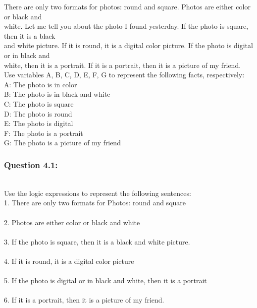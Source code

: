 There are only two formats for photos: round and square. Photos are either color or black and\\
white. Let me tell you about the photo I found yesterday. If the photo is square, then it is a black\\
and white picture. If it is round, it is a digital color picture. If the photo is digital or in black and\\
white, then it is a portrait. If it is a portrait, then it is a picture of my friend.\\
Use variables A, B, C, D, E, F, G to represent the following facts, respectively:\\
\tabto{1cm}A: The photo is in color\\
\tabto{1cm}B: The photo is in black and white\\
\tabto{1cm}C: The photo is square\\
\tabto{1cm}D: The photo is round\\
\tabto{1cm}E: The photo is digital\\
\tabto{1cm}F: The photo is a portrait\\
\tabto{1cm}G: The photo is a picture of my friend\\
\subsubsection{Question 4.1:}\\
Use the logic expressions to represent the following sentences:\\
\tabto{1cm} 1. There are only two formats for Photos: round and square\\
\tabto{2cm}\\
\tabto{1cm} 2. Photos are either color or black and white\\
\tabto{2cm}\\
\tabto{1cm} 3. If the photo is square, then it is a black and white picture.\\
\tabto{2cm}\\
\tabto{1cm} 4. If it is round, it is a digital color picture\\
\tabto{2cm}\\
\tabto{1cm} 5. If the photo is digital or in black and white, then it is a portrait\\
\tabto{2cm}\\
\tabto{1cm} 6. If it is a portrait, then it is a picture of my friend.\\
\tabto{2cm}\\
